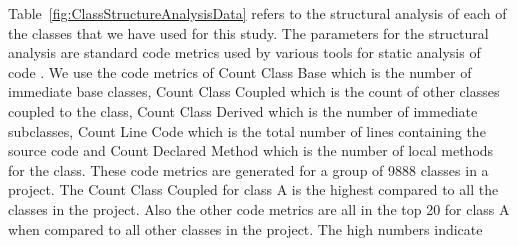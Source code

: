 Table~\ref{fig:ClassStructureAnalysisData} refers to the structural analysis of each of the classes that we have used for this study. The parameters for the structural analysis are standard code metrics used by various tools for static analysis of code . We use the code metrics of Count Class Base which is the number of immediate base classes, Count Class Coupled which is the count of other classes coupled to the class, Count Class Derived which is the number of immediate subclasses, Count Line Code which is the total number of lines containing the source code and Count Declared Method which is the number of local methods for the class. These code metrics are generated for a group of 9888 classes in a project. The Count Class Coupled for class A is the highest compared to all the classes in the project. Also the other code metrics are all in the top 20 for class A when compared to all other classes in the project. The high numbers indicate 

